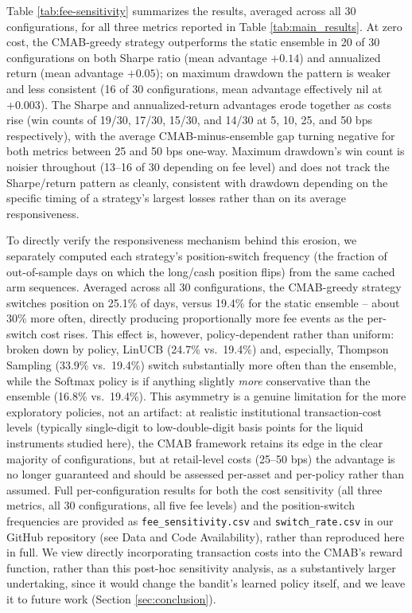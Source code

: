 \documentclass[pdflatex,sn-mathphys-num]{sn-jnl}
\theoremstyle{thmstyleone}%
\theoremstyle{thmstyletwo}%
\theoremstyle{thmstylethree}%
\begin{document}
\begin{appendices}
Table \ref{tab:fee-sensitivity} summarizes the results, averaged across all 30 configurations, for all three metrics reported in Table \ref{tab:main_results}. At zero cost, the CMAB-greedy strategy outperforms the static ensemble in 20 of 30 configurations on both Sharpe ratio (mean advantage $+0.14$) and annualized return (mean advantage $+0.05$); on maximum drawdown the pattern is weaker and less consistent (16 of 30 configurations, mean advantage effectively nil at $+0.003$). The Sharpe and annualized-return advantages erode together as costs rise (win counts of 19/30, 17/30, 15/30, and 14/30 at 5, 10, 25, and 50 bps respectively), with the average CMAB-minus-ensemble gap turning negative for both metrics between 25 and 50 bps one-way. Maximum drawdown's win count is noisier throughout (13--16 of 30 depending on fee level) and does not track the Sharpe/return pattern as cleanly, consistent with drawdown depending on the specific timing of a strategy's largest losses rather than on its average responsiveness.

To directly verify the responsiveness mechanism behind this erosion, we separately computed each strategy's position-switch frequency (the fraction of out-of-sample days on which the long/cash position flips) from the same cached arm sequences. Averaged across all 30 configurations, the CMAB-greedy strategy switches position on 25.1\% of days, versus 19.4\% for the static ensemble -- about 30\% more often, directly producing proportionally more fee events as the per-switch cost rises. This effect is, however, policy-dependent rather than uniform: broken down by policy, LinUCB (24.7\% vs.\ 19.4\%) and, especially, Thompson Sampling (33.9\% vs.\ 19.4\%) switch substantially more often than the ensemble, while the Softmax policy is if anything slightly \emph{more} conservative than the ensemble (16.8\% vs.\ 19.4\%). This asymmetry is a genuine limitation for the more exploratory policies, not an artifact: at realistic institutional transaction-cost levels (typically single-digit to low-double-digit basis points for the liquid instruments studied here), the CMAB framework retains its edge in the clear majority of configurations, but at retail-level costs (25--50 bps) the advantage is no longer guaranteed and should be assessed per-asset and per-policy rather than assumed. Full per-configuration results for both the cost sensitivity (all three metrics, all 30 configurations, all five fee levels) and the position-switch frequencies are provided as \texttt{fee\_sensitivity.csv} and \texttt{switch\_rate.csv} in our GitHub repository (see Data and Code Availability), rather than reproduced here in full. We view directly incorporating transaction costs into the CMAB's reward function, rather than this post-hoc sensitivity analysis, as a substantively larger undertaking, since it would change the bandit's learned policy itself, and we leave it to future work (Section \ref{sec:conclusion}).


\end{appendices}
\end{document}
